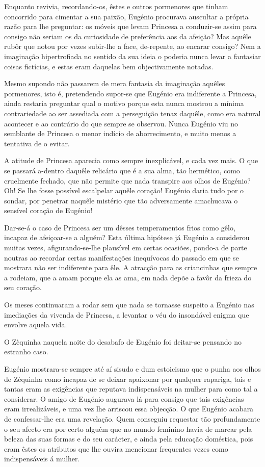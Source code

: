 \documentclass[9pt]{article}
\begin{document}
Enquanto revivia, recordando-os, êstes e outros pormenores que tinham concorrido para cimentar a sua paixão, Eugé\-nio procurava auscultar a própria razão para lhe preguntar: os móveis que levam Princesa a conduzir-se assim para consigo não seriam os da curiosidade de preferência aos da afei\-ção? Mas
a\-quê\-le rubôr que notou por vezes subir-\-lhe a face, de-repente, ao encarar consigo? Nem a imagina\-ção hipertrofiada no sentido da sua ideia o poderia nunca levar a fantasiar coisas fictícias, e estas eram daquelas bem objectivamente notadas.

Mesmo supondo não passarem de mera fantasia da imagina\-ção a\-quê\-les pormenores, isto é, pretendendo supor-se que Eugé\-nio era indiferente a Princesa, ainda
restaria preguntar qual o motivo porque esta nunca mostrou a mínima contrariedade ao ser assediada com a persegui\-ção tenaz da\-quê\-le, como era natural acontecer e ao contrário do que sempre se observou. Nunca Eugé\-nio viu no semblante de Princesa o menor indício de aborrecimento, e muito menos a tentativa de
o evitar.

A atitude de Princesa aparecia como sempre inexplicável, e cada vez mais.
O que se passará a-dentro da\-quê\-le relicário que é a sua alma, tão hermético,
como cruelmente fechado, que não permite que nada transpire aos o\-lhos de Eugé\-nio? Oh! Se lhe fosse possível escalpelar a\-quê\-le cora\-ção! Eugé\-nio daria
tudo por o sondar, por penetrar na\-quê\-le mistério que tão adversamente amachucava o sensível cora\-ção de Eugé\-nio!

Dar-se-á o caso de Princesa ser um dêsses temperamentos frios como gêlo, incapaz de afeiçoar-se a alguém? Esta última hipótese já Eugé\-nio a considerou muitas vezes, afigurando-se-\-lhe plausível em certas ocasiões, pondo-a
de parte noutras ao recordar certas manifesta\-ções inequívocas do passado em
que se mostrara não ser indiferente para êle. A atrac\-ção para as criancinhas
que sempre a rodeiam, que a amam porque ela as ama, em nada depõe a favôr da
frieza do seu cora\-ção.

Os meses continuaram a rodar sem que nada se tornasse suspeito a Eugé\-nio nas imedia\-ções da vivenda de Princesa, a levantar o véu do insondável enigma que envolve aquela vida.

O Zèquinha naquela noite do desabafo de Eugé\-nio foi deitar-se pensando
no estranho caso.

Eugé\-nio mostrara-se sempre até aí sisudo e dum estoicismo que o punha aos o\-lhos de Zèquinha como incapaz de se deixar apaixonar por qualquer rapariga, tais e tantas eram as exi\-gên\-cias que reputava indispensáveis
na mu\-lher para como tal a considerar. O amigo de Eugé\-nio augurava lá para
consigo que tais exi\-gên\-cias eram irrealizáveis, e uma vez lhe arriscou
essa objec\-ção. O que Eugé\-nio acabara de confessar-\-lhe era uma revela\-ção.
Quem conseguiu requestar tão profundamente o seu afecto era por certo alguém que no mundo feminino havia de marcar pela beleza das suas formas
e do seu carácter, e ainda pela educa\-ção doméstica, pois eram êstes os atributos que lhe ouvira mencionar frequentes vezes como indispensáveis á
mu\-lher.
\end{document}
